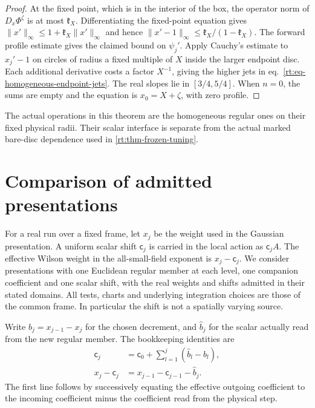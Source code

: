 \documentclass[11pt,letterpaper,reqno]{amsart}
\numberwithin{equation}{section}
\renewcommand{\eqref}[1]{\textup{eq.~\ref{#1}}}
\theoremstyle{definition}
\theoremstyle{remark}
\begin{document}
\begin{proof}
At the fixed point, which is in the interior of the box, the
operator norm of $D_x\Phi^\zeta$ is at most $\mathfrak k_X$.
Differentiating the fixed-point equation gives
$\|x'\|_\infty\le1+\mathfrak k_X\|x'\|_\infty$ and hence
$\|x'-1\|_\infty\le\mathfrak k_X/(1-\mathfrak k_X)$.
The forward profile estimate gives the claimed bound on $\psi_j'$.
Apply Cauchy's estimate to $x_j'-1$ on circles of radius a fixed
multiple of $X$ inside the larger endpoint disc. Each additional
derivative costs a factor $X^{-1}$, giving the higher jets in
\eqref{rt:eq-homogeneous-endpoint-jets}. The real slopes lie in
$[3/4,5/4]$. When $n=0$, the sums are empty and the equation is
$x_0=X+\zeta$, with zero profile.
\end{proof}

The actual operations in this theorem are the homogeneous regular
ones on their fixed physical radii. Their scalar interface is
separate from the actual marked bare-disc dependence used in
\cref{rt:thm-frozen-tuning}.

\section{Comparison of admitted presentations}
\label{rt:sec-presentation-matching}

For a real run over a fixed frame, let $x_j$ be the weight used
in the Gaussian presentation. A uniform scalar shift $\mathsf c_j$ is
carried in the local action as $\mathsf c_j A$. The effective Wilson
weight in the all-small-field exponent is $x_j-\mathsf c_j$. We consider
presentations with one Euclidean regular member at each level,
one companion coefficient and one scalar shift, with the real
weights and shifts admitted in their stated domains. All tests,
charts and underlying integration choices are those of the common
frame. In particular the shift is not a spatially varying source.

Write $b_j=x_{j-1}-x_j$ for the chosen decrement, and $\widehat b_j$
for the scalar actually read from the new regular member. The
bookkeeping identities are
\begin{equation}\label{rt:eq-effective-weight}
 \begin{aligned}
  \mathsf c_j&=\mathsf c_0+\sum_{l=1}^j(\widehat b_l-b_l),\\
  x_j-\mathsf c_j&=x_{j-1}-\mathsf c_{j-1}-\widehat b_j .
 \end{aligned}
\end{equation}
The first line follows by successively equating the
effective outgoing coefficient to the incoming coefficient minus
the coefficient read from the physical step.
\end{document}
